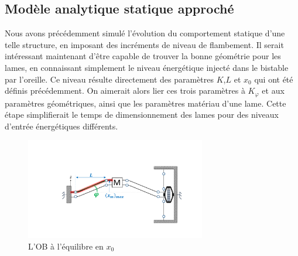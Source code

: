 	\subsection{Modèle analytique statique approché} 
Nous avons précédemment simulé l'évolution du comportement statique d'une telle structure, en imposant des incréments de niveau de flambement. Il serait intéressant maintenant d'être capable de trouver la bonne géométrie pour les lames, en connaissant simplement le niveau énergétique injecté dans le bistable par l'oreille. Ce niveau résulte directement des paramètres $K$,$L$ et $x_0$ qui ont été définis précédemment. On aimerait alors lier ces trois paramètres à $K_{\varphi}$ et aux paramètres géométriques, ainsi que les paramètres matériau d'une lame. Cette étape simplifierait le temps de dimensionnement des lames pour des niveaux d'entrée énergétiques différents.
\begin{figure}[!htbp]
\begin{center}
    \captionsetup{justification=centering}
	\includegraphics[trim={6cm 2.8cm 4cm 5cm},clip, width=0.7\textwidth]{../Chap3/Figure/OB_surbrillance_1_lame.pdf}
	\caption{L'OB à l'équilibre en $x_0$}
	\label{fig:OB_surbrillance_1_lame}
\end{center}
\end{figure}

